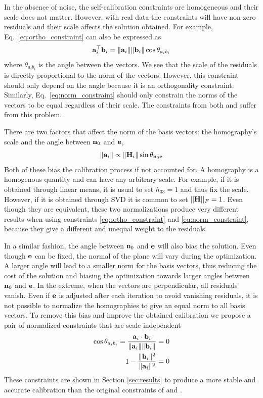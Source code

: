 \documentclass[10pt,twocolumn,letterpaper]{article}
\begin{document}
In the absence of noise, the self-calibration constraints are homogeneous and their scale does not matter. However, with real data the constraints will have non-zero residuals and their scale affects the solution obtained. For example, Eq.~\eqref{eq:ortho_constraint} can also be expressed as
\begin{align}
\mathbf{a}_i^\top \mathbf{b}_i = \lVert\mathbf{a}_i\rVert \lVert\mathbf{b}_i\rVert \cos \theta_{a_i b_i}
\end{align} 
where $\theta_{a_i b_i}$ is the angle between the vectors. We see that the scale of the residuals is directly proportional to the norm of the vectors. However, this constraint should only depend on the angle because it is an orthogonality constraint. Similarly, Eq.~\eqref{eq:norm_constraint} should only constrain the norms of the vectors to be equal regardless of their scale. The constraints from both \cite{bocquillon2006} and \cite{gurdjos2003} suffer from this problem.

%
There are two factors that affect the norm of the basis vectors: the homography's scale and the angle between $\mathbf{n}_0$ and $\mathbf{e}$, \ie
%
\begin{align}
\lVert\mathbf{a}_i\rVert \propto \lVert\mathbf{H}_i\rVert \sin \theta_{\mathbf{n}_0 \mathbf{e}}
\end{align} 
%
Both of these bias the calibration process if not accounted for. A homography is a homogenous quantity and can have any arbitrary scale. For example, if it is obtained through linear means, it is usual to set $h_{33}=1$ and thus fix the scale. However, if it is obtained through SVD it is common to set $||\mathbf{H}||_F=1$. Even though they are equivalent, these two normalizations produce very different results when using constraints \eqref{eq:ortho_constraint} and \eqref{eq:norm_constraint}, because they give a different and unequal weight to the residuals. 

In a similar fashion, the angle between $\mathbf{n}_0$ and $\mathbf{e}$ will also bias the solution. Even though $\mathbf{e}$ can be fixed, the normal of the plane will vary during the optimization. A larger angle will lead to a smaller norm for the basis vectors, thus reducing the cost of the solution and biasing the optimization towards larger angles between $\mathbf{n}_0$ and $\mathbf{e}$. In the extreme, when the vectors are perpendicular, all residuals vanish. 
%
Even if $\mathbf{e}$ is adjusted after each iteration to avoid vanishing residuals, it is not possible to normalize the homographies to give an equal norm to all basis vectors. To remove this bias and improve the obtained calibration we propose a pair of normalized constraints that are scale independent
%
\begin{align}
\cos \theta_{a_i b_i} = \frac{\mathbf{a}_i \cdot \mathbf{b}_i}{\lVert\mathbf{a}_i\rVert \lVert\mathbf{b}_i\rVert} &= 0 \label{eq:ortho_constraint_normalized}\\
1 - \frac{\lVert\mathbf{b}_i\rVert^2}{\lVert\mathbf{a}_i\rVert^2} &= 0 \label{eq:norm_constraint_normalized}
\end{align}
These constraints are shown in Section \ref{sec:results} to produce a more stable and accurate calibration than the original constraints of \cite{bocquillon2006} and \cite{gurdjos2003}. 
\end{document}
